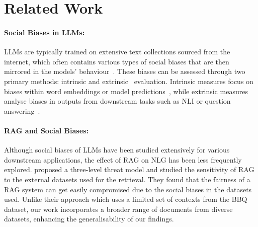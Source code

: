 \section{Related Work}
\label{sec:related}


\paragraph{Social Biases in LLMs:}
\acp{LLM} are typically trained on extensive text collections sourced from the internet, which often contains various types of social biases that are then mirrored in the models' behaviour~\cite{Penedo:2024}. 
These biases can be assessed through two primary methods: intrinsic and extrinsic~\cite{goldfarb-tarrant-etal-2021-intrinsic,cao-etal-2022-intrinsic} evaluation.
Intrinsic measures focus on biases within word embeddings or model predictions~\cite{caliskan-et-al-weat,nangia-etal-2020-crows,nadeem-etal-2021-stereoset,kaneko-etal-2022-debiasing}, while extrinsic measures analyse biases in outputs from downstream tasks such as \ac{NLI} or question answering~\cite{webster-2020-sts,De-Arteaga-biasbios}.

\paragraph{RAG and Social Biases:}
Although social biases of \acp{LLM} have been studied extensively for various downstream applications, the effect of \ac{RAG} on \ac{NLG} has been less frequently explored.
\citet{Hu:2021} proposed a three-level threat model and studied the sensitivity of \ac{RAG} to the external datasets used for the retrieval.
They found  that the fairness of a \ac{RAG} system can get easily compromised due to the social biases in the datasets used.
Unlike their approach which uses a limited set of contexts from the \ac{BBQ} dataset, our work incorporates a broader range of documents from diverse datasets, enhancing the generalisability of our findings.

